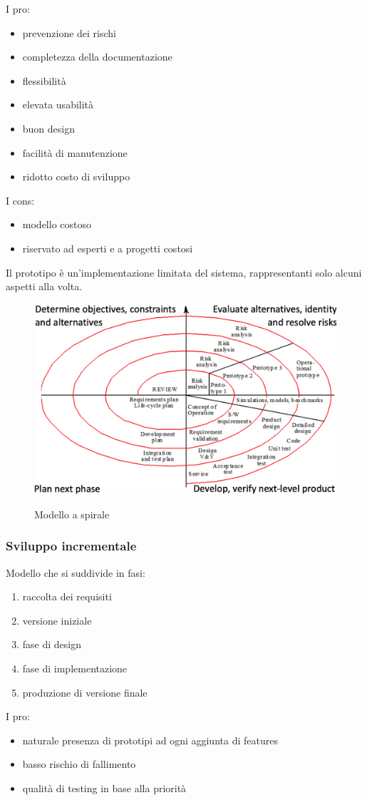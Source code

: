 \documentclass{article}
\begin{document}
I pro:
\begin{itemize}
    \item prevenzione dei rischi
    \item completezza della documentazione
    \item flessibilità
    \item elevata usabilità
    \item buon design
    \item facilità di manutenzione
    \item ridotto costo di sviluppo
\end{itemize}

I cons:
\begin{itemize}
    \item modello costoso
    \item riservato ad esperti e a progetti costosi
\end{itemize}

Il prototipo è un'implementazione limitata del sistema, rappresentanti solo alcuni aspetti alla volta.

\begin{figure}[h!]
    \centering
    \includegraphics[width=0.5\linewidth]{imgs/2 - spirale.png}
    \label{fig:modello_spirale}
    \caption{Modello a spirale}
\end{figure}

\subsubsection{Sviluppo incrementale}
Modello che si suddivide in fasi:
\begin{enumerate}
    \item raccolta dei requisiti
    \item versione iniziale
    \item fase di design
    \item fase di implementazione
    \item produzione di versione finale
\end{enumerate}

I pro:
\begin{itemize}
    \item naturale presenza di prototipi ad ogni aggiunta di features
    \item basso rischio di fallimento
    \item qualità di testing in base alla priorità
\end{itemize}
\end{document}
